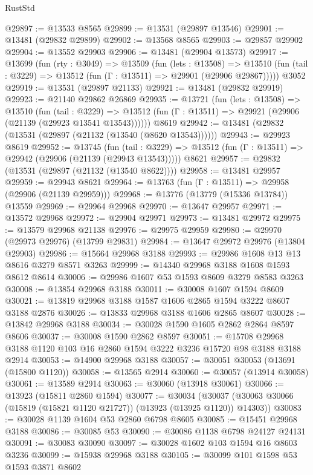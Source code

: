 \begin{lexlean}{RustStd}
\begin{coremodule}
@29897 := @13533 @8565
@29899 := @13531 (@29897 @13546)
@29901 := @13481 (@29832 @29899)
@29902 := @13568 @8565
@29903 := @29857 @29902
@29904 := @13552 @29903
@29906 := @13481 (@29904 @13573)
@29917 := @13699
    (fun (rty : @3049) =>
    @13509
      (fun (lets : @13508) =>
      @13510 (fun (tail : @3229) => @13512 (fun (Γ : @13511) => @29901 (@29906 @29867)))))
    @3052
@29919 := @13531 (@29897 @21133)
@29921 := @13481 (@29832 @29919)
@29923 := @21140 @29862 @26869
@29935 := @13721
    (fun (lets : @13508) =>
    @13510
      (fun (tail : @3229) =>
      @13512 (fun (Γ : @13511) => @29921 (@29906 (@21139 (@29923 @13541 @13543))))))
    @8619
@29942 := @13481 (@29832 (@13531 (@29897 (@21132 (@13540 (@8620 @13543))))))
@29943 := @29923 @8619
@29952 := @13745
    (fun (tail : @3229) => @13512 (fun (Γ : @13511) => @29942 (@29906 (@21139 (@29943 @13543)))))
    @8621
@29957 := @29832 (@13531 (@29897 (@21132 (@13540 @8622))))
@29958 := @13481 @29957
@29959 := @29943 @8621
@29964 := @13763 (fun (Γ : @13511) => @29958 (@29906 (@21139 @29959)))
@29968 := @13776 (@13779 (@15336 @13784)) @13559
@29969 := @29964 @29968
@29970 := @13647 @29957
@29971 := @13572 @29968
@29972 := @29904 @29971
@29973 := @13481 @29972
@29975 := @13579 @29968 @21138
@29976 := @29975 @29959
@29980 := @29970 (@29973 @29976) (@13799 @29831)
@29984 := @13647 @29972 @29976 (@13804 @29903)
@29986 := @15664 @29968 @3188
@29993 := @29986 @1608 @13 @13 @8616 @3279 @8571 @3263
@29999 := @14340 @29968 @3188 @1608 @1593 @8612 @8614
@30006 := @29986 @1607 @53 @1593 @8609 @3279 @8583 @3263
@30008 := @13854 @29968 @3188
@30011 := @30008 @1607 @1594 @8609
@30021 := @13819 @29968 @3188 @1587 @1606 @2865 @1594 @3222 @8607 @3188 @2876
@30026 := @13833 @29968 @3188 @1606 @2865 @8607
@30028 := @13842 @29968 @3188
@30034 := @30028 @1590 @1605 @2862 @2864 @8597 @8606
@30037 := @30008 @1590 @2862 @8597
@30051 := @15708 @29968 @3188 @1120 @103 @16 @2860 @1594 @3222 @3236 @15720 @98 @3188 @3188 @2914
@30053 := @14900 @29968 @3188
@30057 := @30051 @30053 (@13691 (@15800 @1120))
@30058 := @13565 @2914
@30060 := @30057 (@13914 @30058)
@30061 := @13589 @2914
@30063 := @30060 (@13918 @30061)
@30066 := @13923 (@15811 @2860 @1594)
@30077 := @30034
    (@30037 (@30063 @30066 (@15819 (@15821 @1120 @21727)) (@13923 (@13925 @1120)) @14303))
@30083 := @30028 @1139 @1604 @53 @2860 @6798 @8605
@30085 := @15451 @29968 @3188
@30086 := @30085 @53
@30090 := @30086 @1138 @6798 @24127 @24131
@30091 := @30083 @30090
@30097 := @30028 @1602 @103 @1594 @16 @8603 @3236
@30099 := @15938 @29968 @3188
@30105 := @30099 @101 @1598 @53 @1593 @3871 @8602

\end{coremodule}
\end{lexlean}
